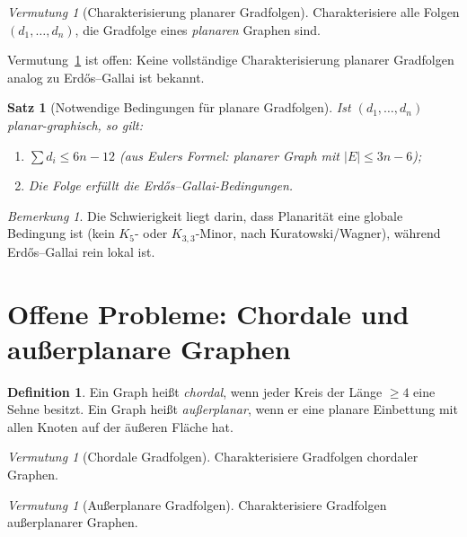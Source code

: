 \documentclass[12pt,a4paper]{amsart}
\newtheorem{satz}[theorem]{Satz}
\theoremstyle{definition}
\newtheorem{definition_de}[theorem]{Definition}
\theoremstyle{remark}
\newtheorem{bemerkung}[theorem]{Bemerkung}
\newtheorem{vermutung}[theorem]{Vermutung}
\begin{document}
\begin{vermutung}[Charakterisierung planarer Gradfolgen]
\label{verm:planar}
Charakterisiere alle Folgen $(d_1, \ldots, d_n)$, die Gradfolge eines
\emph{planaren} Graphen sind.
\end{vermutung}

Vermutung~\ref{verm:planar} ist offen: Keine vollständige Charakterisierung
planarer Gradfolgen analog zu Erd\H{o}s--Gallai ist bekannt.

\begin{satz}[Notwendige Bedingungen für planare Gradfolgen]
Ist $(d_1, \ldots, d_n)$ planar-graphisch, so gilt:
\begin{enumerate}[label=(\roman*)]
  \item $\sum d_i \leq 6n - 12$ (aus Eulers Formel: planarer Graph mit
        $|E| \leq 3n-6$);
  \item Die Folge erfüllt die Erd\H{o}s--Gallai-Bedingungen.
\end{enumerate}
\end{satz}

\begin{bemerkung}
Die Schwierigkeit liegt darin, dass Planarität eine globale Bedingung ist
(kein $K_5$- oder $K_{3,3}$-Minor, nach Kuratowski/Wagner), während
Erd\H{o}s--Gallai rein lokal ist.
\end{bemerkung}

\section{Offene Probleme: Chordale und außerplanare Graphen}

\begin{definition_de}
Ein Graph heißt \emph{chordal}, wenn jeder Kreis der Länge $\geq 4$ eine
Sehne besitzt.
Ein Graph heißt \emph{außerplanar}, wenn er eine planare Einbettung mit allen
Knoten auf der äußeren Fläche hat.
\end{definition_de}

\begin{vermutung}[Chordale Gradfolgen]
\label{verm:chordal}
Charakterisiere Gradfolgen chordaler Graphen.
\end{vermutung}

\begin{vermutung}[Außerplanare Gradfolgen]
\label{verm:ausserplanar}
Charakterisiere Gradfolgen außerplanarer Graphen.
\end{vermutung}
\end{document}
